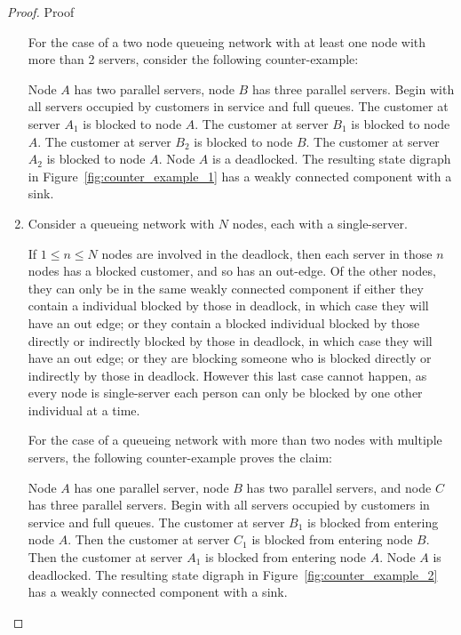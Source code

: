 \documentclass{article}
\numberwithin{equation}{section}
\begin{document}
\begin{proof}{Proof}
\begin{enumerate}
  For the case of a two node queueing network with at least one node with more than 2 servers, consider the following counter-example:


  Node $A$ has two parallel servers, node $B$ has three parallel servers.
  Begin with all servers occupied by customers in service and full queues.
  The customer at server $A_1$ is blocked to node $A$.
  The customer at server $B_1$ is blocked to node $A$.
  The customer at server $B_2$ is blocked to node $B$.
  The customer at server $A_2$ is blocked to node $A$.
  Node $A$ is a deadlocked.
  The resulting state digraph in Figure~\ref{fig:counter_example_1} has a weakly connected component with a sink.

  \item
  Consider a queueing network with $N$ nodes, each with a single-server.

  If $1 \leq n \leq N$ nodes are involved in the deadlock, then each server in those $n$ nodes has a blocked customer, and so has an out-edge.
  Of the other nodes, they can only be in the same weakly connected component if either they contain a individual blocked by those in deadlock, in which case they will have an out edge; or they contain a blocked individual blocked by those directly or indirectly blocked by those in deadlock, in which case they will have an out edge; or they are blocking someone who is blocked directly or indirectly by those in deadlock.
  However this last case cannot happen, as every node is single-server each person can only be blocked by one other individual at a time.

  For the case of a queueing network with more than two nodes with multiple servers, the following counter-example proves the claim:

  Node $A$ has one parallel server, node $B$ has two parallel servers, and node $C$ has three parallel servers.
  Begin with all servers occupied by customers in service and full queues.
  The customer at server $B_1$ is blocked from entering node $A$.
  Then the customer at server $C_1$ is blocked from entering node $B$.
  Then the customer at server $A_1$ is blocked from entering node $A$.
  Node $A$ is deadlocked.
  The resulting state digraph in Figure~\ref{fig:counter_example_2} has a weakly connected component with a sink.
  \end{enumerate}
\end{proof}
\end{document}
